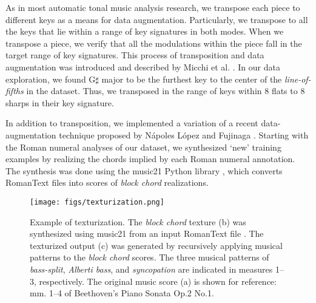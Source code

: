 

As in most automatic tonal music analysis research, we
transpose each piece to different keys as a means for data
augmentation. Particularly, we transpose to all the keys
that lie within a range of key signatures in both modes.
When we transpose a piece, we verify that all the
modulations within the piece fall in the target range of key
signatures. This process of transposition and data
augmentation was introduced and described by Micchi et al.
\cite{micchi2020not}. In our data exploration, we found
G$\sharp$ major to be the furthest key to the center of the
\emph{line-of-fifths} \cite{temperley2000line} in the
dataset. Thus, we transposed in the range of keys within 8
flats to 8 sharps in their key signature.


In addition to transposition, we implemented a variation of
a recent data-augmentation technique proposed by N\'apoles
L\'opez and Fujinaga \cite{napoleslopez2020harmonic}.
Starting with the Roman numeral analyses of our dataset, we
synthesized `new' training examples by realizing the chords
implied by each Roman numeral annotation. The synthesis was
done using the music21 Python library
\cite{cuthbert_music21_2010}, which converts RomanText
\cite{gotham2019romantext} files into scores of \emph{block
chord} realizations.

\begin{figure}
 \centerline{\texttt{[image: figs/texturization.png]}}
 \caption{Example of texturization. The \emph{block chord}
 texture (b) was synthesized using music21
 \cite{cuthbert_music21_2010} from an input RomanText file
 \cite{gotham2019romantext}. The texturized output (c) was
 generated by recursively applying musical patterns to the
 \emph{block chord} scores. The three musical patterns of
 \emph{bass-split}, \emph{Alberti bass}, and
 \emph{syncopation} are indicated in measures 1--3,
 respectively. The original music score (a) is shown for
 reference: mm. 1--4 of Beethoven's Piano Sonata Op.2 No.1.}
 \label{fig:texturization}
\end{figure}

